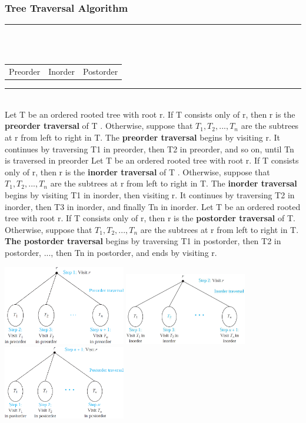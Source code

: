 \documentclass[12pt, letterpaper]{article}
\newcommand{\horizline}[0]{\noindent\rule{\textwidth}{1pt}\\}
\begin{document}
\pagebreak

\subsubsection{Tree Traversal Algorithm}
\horizline  \vspace*{-0.85cm} \\
\begin{center}
	\begin{tabular}{c c c}
		Preorder & Inorder & Postorder
	\end{tabular}
\end{center}
\horizline
Let T be an ordered rooted tree with root r. If T consists only of r, then r is the \textbf{preorder traversal} of T . \smallbreak
Otherwise, suppose that $T_1, T_2, . . . , T_n$ are the subtrees at r from left to
right in T. The \textbf{preorder traversal} begins by visiting r. It continues by
traversing T1 in preorder, then T2 in preorder, and so on, until Tn is
traversed in preorder
\bigbreak
Let T be an ordered rooted tree with root r. If T consists only of r, then r is the \textbf{inorder traversal} of T . \smallbreak
Otherwise, suppose that $T_1, T_2, . . . , T_n$ are the subtrees at r from left to
right in T. The \textbf{inorder traversal} begins by visiting T1 in inorder, then visiting
r. It continues by traversing T2 in inorder, then T3 in inorder, and finally Tn
in inorder.
\bigbreak
Let T be an ordered rooted tree with root r. If T consists only of r, then r is the \textbf{postorder traversal} of T. \smallbreak
Otherwise, suppose that $T_1, T_2, . . . , T_n$ are the subtrees at r from left to
right in T. \textbf{The postorder traversal} begins by traversing T1 in postorder, then
T2 in postorder, ..., then Tn in postorder, and ends by visiting r.


\bigbreak
\begin{center}
	\includegraphics[width=0.4\textwidth]{traversal.png} \includegraphics[width=0.4\textwidth]{inorder.png} \bigbreak
	\includegraphics[width=0.4\textwidth]{postorder.png}
\end{center}
\pagebreak
\end{document}
